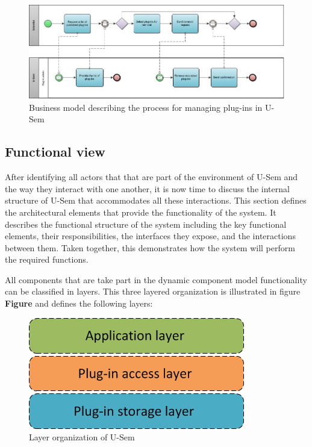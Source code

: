 \begin{figure}[h!]
  \centering
  	\includegraphics[scale=0.6]{plug-in/business_processes/PluginManagementBusinessModel.jpg}
  \caption{Business model describing the process for managing plug-ins in U-Sem}
\end{figure}


\subsection{Functional view}

After identifying all actors that that are part of the environment of U-Sem and the way they interact with one another, it is now time to discuss the internal structure of U-Sem that accommodates all these interactions. This section defines the architectural elements that provide the functionality of the system. It describes the functional structure of the system including the key functional elements, their responsibilities, the interfaces they expose, and the interactions between them. Taken together, this demonstrates how the system will perform the required functions.

All components that are take part in the dynamic component model functionality can be classified in layers. This three layered organization is illustrated in figure \textbf{Figure} and defines the following layers:

\begin{figure}[h!]
  \centering
  	\includegraphics[scale=0.6]{plug-in/layers/layers.png}
  \caption{Layer organization of U-Sem}
\end{figure}

